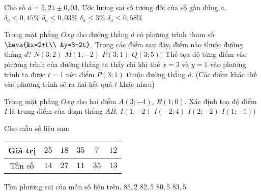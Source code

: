 \begin{ex}%
	Cho số $\overline{a}=5,21\pm 0,03$. Ước lượng sai số tương đối của số gần đúng $a$.  
	\choice
	{$\delta_a\leq 0,45\%$}
	{$\delta_a\leq 0,03\%$}
	{$\delta_a\leq 3\%$}
	{\True $\delta_a\leq 0,58\%$}
\end{ex}
\begin{ex}%
	Trong mặt phẳng $Oxy$ cho đường thẳng $d$ có phương trình tham số $\heva{&x=2+t\\ &y=3-2t}$. Trong các điểm sau đây, điểm nào thuộc đường thẳng $d$?
	\choice
	{$N(3;2)$}
	{$M(1;-2)$}
	{\True $P(3;1)$}
	{ $Q(3;5))$}
	\loigiai
	{
		Thế tọa độ từng điểm vào phương trình của đường thẳng ta thấy chỉ khi thế $x=3$ và $y=1$ vào phương trình ta được $t=1$ nên điểm $P(3;1)$ thuộc đường thẳng $d$. (Các điểm khác thế vào phương trình sẽ ra hai kết quả $t$ khác nhau)
	}
\end{ex}
\begin{ex}%
	Trong mặt phẳng $Oxy$ cho hai điểm $A(3;-4)$, $B(1;0)$. Xác định toạ độ điểm $I$ là trung điểm của đoạn thẳng $AB$.
	\choice
	{$I(1;-2)$}
	{$I(-2;4)$}
	{\True $I(2;-2)$}
	{$I(1;-1))$}
\end{ex}
\begin{ex}%
	Cho mẫu số liệu sau:
	\begin{center}
		\begin{tabular}{|c|c|c|c|c|c|}
			\hline
			Giá trị &$25$&$18$&$35$&$7$&$12$\\
			\hline
			Tần số &$14$&$27$&$11$&$35$&$13$\\
			\hline
		\end{tabular}
	\end{center}
	Tìm phương sai của mẫu số liệu trên.
	\choice
	{ $85{,}2$}
	{\True $82{,}5$}
	{$80{,}5$}
	{$83{,}5$}
\end{ex}
